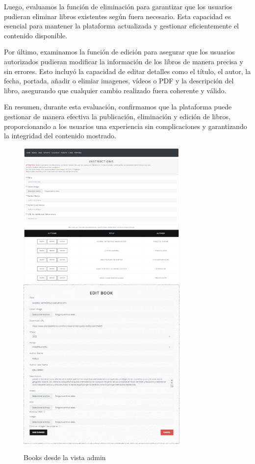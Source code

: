 \documentclass[a4paper, 12pt]{book}
\begin{document}
\begin{itemize}
Luego, evaluamos la función de eliminación para garantizar que los usuarios pudieran eliminar libros existentes según fuera necesario. Esta capacidad es 
esencial para mantener la plataforma actualizada y gestionar eficientemente el contenido disponible.

Por último, examinamos la función de edición para asegurar que los usuarios autorizados pudieran modificar la información de los libros de manera precisa 
y sin errores. Esto incluyó la capacidad de editar detalles como el título, el autor, la fecha, portada, añadir o elimiar imagenes, vídeos o PDF y la descripción 
del libro, asegurando que cualquier cambio realizado fuera coherente y válido.

En resumen, durante esta evaluación, confirmamos que la plataforma puede gestionar de manera efectiva la publicación, eliminación y edición de libros, 
proporcionando a los usuarios una experiencia sin complicaciones y garantizando la integridad del contenido mostrado.
\begin{figure}
  \centering
  \includegraphics[width=0.75\textwidth]{img/booksadmin.png}
  \includegraphics[width=0.75\textwidth]{img/booksadmin2.png}
  \includegraphics[width=0.75\textwidth]{img/booksadmin3.png}
  \caption{Books desde la vista admin}
  \label{fig:librosadminedit}
\end{figure}


\end{itemize}
\end{document}
